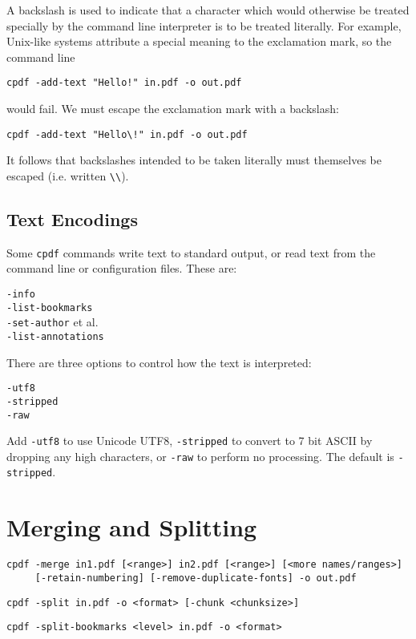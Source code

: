\documentclass{book}
\begin{document}
A backslash is used to indicate that a character which would otherwise be
treated specially by the command line interpreter is to be treated literally. For
example, Unix-like systems attribute a special meaning to the exclamation mark, so
the command line
\begin{framed}
 \small\verb?cpdf -add-text "Hello!" in.pdf -o out.pdf?
\end{framed}
\noindent would fail. We must escape the exclamation mark with a backslash:
\begin{framed}
 \small\verb?cpdf -add-text "Hello\!" in.pdf -o out.pdf?
\end{framed}
\noindent It follows that backslashes intended to be taken literally must themselves be
escaped (i.e. written \verb!\\!).

\section{Text Encodings}

Some \texttt{cpdf} commands write text to standard output, or read text from
the command line or configuration files. These are:

\begin{framed}
  \noindent\small\verb!-info!\\
  \noindent\small\verb!-list-bookmarks!\\
  \noindent\small\verb!-set-author! et al.\\
  \noindent\small\verb!-list-annotations!
\end{framed}

\noindent There are three options to control how the text is interpreted:

\begin{framed}
  \noindent\small\verb!-utf8!\\
  \noindent\small\verb!-stripped!\\
  \noindent\small\verb!-raw!
\end{framed}

\noindent Add \verb!-utf8! to use Unicode UTF8, \verb!-stripped! to convert to 7
bit ASCII by dropping any high characters, or \verb!-raw! to perform no
processing. The default is \verb!-stripped!.

\chapter{Merging and Splitting}
  \begin{framed}
  \small
  \noindent\begin{verbatim}
cpdf -merge in1.pdf [<range>] in2.pdf [<range>] [<more names/ranges>]
     [-retain-numbering] [-remove-duplicate-fonts] -o out.pdf\end{verbatim}

  \vspace{1.5mm}
  \noindent\verb!cpdf -split in.pdf -o <format> [-chunk <chunksize>]!

  \vspace{1.5mm}
  \noindent\verb!cpdf -split-bookmarks <level> in.pdf -o <format>!
  \end{framed}
\end{document}
